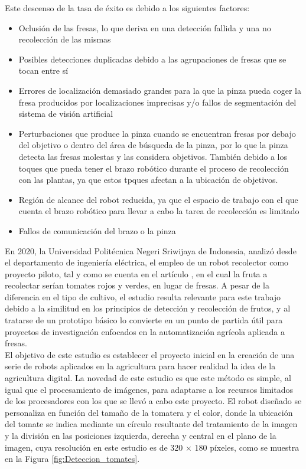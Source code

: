 Este descenso de la tasa de éxito es debido a los siguientes factores:

\begin{itemize}
    \item Oclusión de las fresas, lo que deriva en una detección fallida y una no recolección de las mismas
    \item Posibles detecciones duplicadas debido a las agrupaciones de fresas que se tocan entre sí
    \item Errores de localización demasiado grandes para la que la pinza pueda coger la fresa producidos por localizaciones imprecisas y/o fallos de segmentación del sistema de visión artificial
    \item Perturbaciones que produce la pinza cuando se encuentran fresas por debajo del objetivo o dentro del área de búsqueda de la pinza, por lo que la pinza detecta las fresas molestas y las considera objetivos. También debido a los toques que pueda tener el brazo robótico durante el proceso de recolección con las plantas, ya que estos tpques afectan a la ubicación de objetivos.
    \item Región de alcance del robot reducida, ya que el espacio de trabajo con el que cuenta el brazo robótico para llevar a cabo la tarea de recolección es limitado
    \item Fallos de comunicación del brazo o la pinza
\end{itemize}

En 2020, la Universidad Politécnica Negeri Sriwijaya de Indonesia, analizó desde el departamento de ingeniería eléctrica, el empleo de un robot recolector como proyecto piloto, tal y como se cuenta en el artículo \cite{Oktarina20}, en el cual la fruta a recolectar serían tomates rojos y verdes, en lugar de fresas. A pesar de la diferencia en el tipo de cultivo, el estudio resulta relevante para este trabajo debido a la similitud en los principios de detección y recolección de frutos, y al tratarse de un prototipo básico lo convierte en un punto de partida útil para proyectos de investigación enfocados en la automatización agrícola aplicada a fresas.\\

El objetivo de este estudio es establecer el proyecto inicial en la creación de una serie de robots aplicados en la agricultura para hacer realidad la idea de la agricultura digital. La novedad de este estudio es que este método es simple, al igual que el procesamiento de imágenes, para adaptarse a los recursos limitados de los procesadores con los que se llevó a cabo este proyecto. El robot diseñado se personaliza en función del tamaño de la tomatera y el color, donde la ubicación del tomate se indica mediante un círculo resultante del tratamiento de la imagen y la división en las posiciones izquierda, derecha y central en el plano de la imagen, cuya resolución en este estudio es de 320 × 180 píxeles, como se muestra en la Figura \ref{fig:Deteccion_tomates}. 

